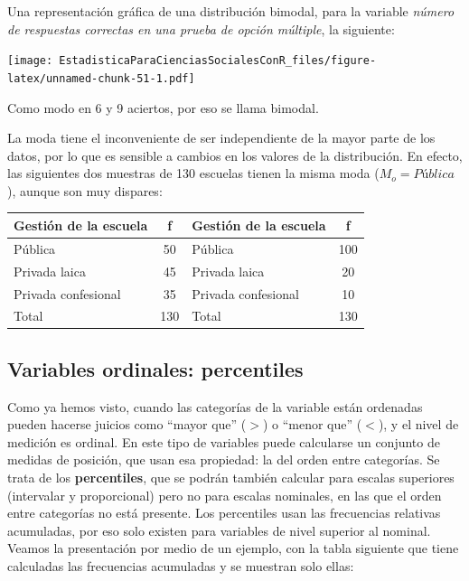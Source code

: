\documentclass[]{book}
\begin{document}
Una representación gráfica de una distribución bimodal, para la variable \emph{número de respuestas correctas en una prueba de opción múltiple}, la siguiente:

\texttt{[image: EstadisticaParaCienciasSocialesConR\_files/figure-latex/unnamed-chunk-51-1.pdf]}

Como modo en 6 y 9 aciertos, por eso se llama bimodal.

La moda tiene el inconveniente de ser independiente de la mayor parte de los datos, por lo que es sensible a cambios en los valores de la
distribución. En efecto, las siguientes dos muestras de 130 escuelas
tienen la misma moda (\(M_o = Pública\)), aunque son muy dispares:

\begin{longtable}[]{@{}lclc@{}}
\toprule
Gestión de la escuela & f & Gestión de la escuela & f\tabularnewline
\midrule
\endhead
Pública & 50 & Pública & 100\tabularnewline
Privada laica & 45 & Privada laica & 20\tabularnewline
Privada confesional & 35 & Privada confesional & 10\tabularnewline
Total & 130 & Total & 130\tabularnewline
\bottomrule
\end{longtable}

\hypertarget{variables-ordinales-percentiles}{%
\subsection{Variables ordinales: percentiles}\label{variables-ordinales-percentiles}}

Como ya hemos visto, cuando las categorías de la variable están
ordenadas pueden hacerse juicios como ``mayor que'' (\(>\)) o ``menor que''
(\(<\)), y el nivel de medición es ordinal. En este tipo de variables
puede calcularse un conjunto de medidas de posición, que usan esa propiedad: la del orden entre categorías. Se trata de los \textbf{percentiles}, que se podrán también calcular para escalas superiores (intervalar y proporcional) pero no para escalas nominales, en las que el orden entre categorías no está presente.
Los percentiles usan las frecuencias relativas acumuladas, por eso solo existen para variables de nivel superior al nominal. Veamos la presentación por medio de un ejemplo, con la tabla siguiente que tiene calculadas las frecuencias acumuladas y se muestran solo ellas:
\end{document}
